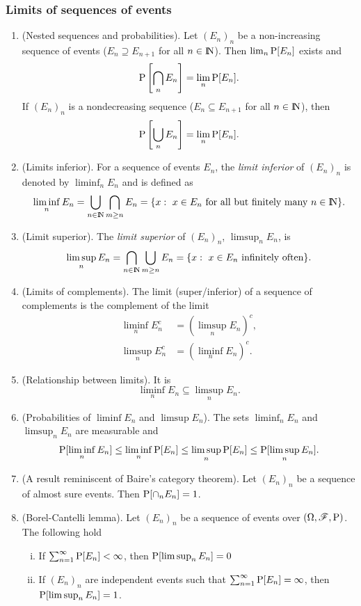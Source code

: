 \documentclass[a4paper,10pt]{scrbook}
\begin{document}
\subsubsection{Limits of sequences of events}
\begin{enumerate}
 \item (Nested sequences and probabilities). Let $(E_n)_n$ be a non-increasing sequence of events ($E_n\supseteq E_{n+1}$ for all $n\in\N$). 
       Then $\lim_n \mathrm{P}[E_n]$ exists and 
       \[
        \mathrm{P}\left[\bigcap_n E_n\right] = \lim_n \mathrm{P}[E_n].
       \]
       If $(E_n)_n$ is a nondecreasing sequence ($E_n \subseteq E_{n+1}$ for all $n\in\N$), then
       \[
        \mathrm{P}\left[\bigcup_n E_n\right] = \lim_n \mathrm{P}[E_n].
       \]


 \item (Limits inferior). For a sequence of events $E_n$, the \textit{limit inferior} of $(E_n)_n$
       is denoted by $\liminf_n E_n$ and is defined as 
       \[
        \liminf_n E_n = \bigcup_{n\in \N}\bigcap_{m\geq n}E_n = \{x:\ x\in E_n\ \text{for all but finitely many } n\in \N\}.
       \]
 \item (Limit superior). The \textit{limit superior} of $(E_n)_n$, $\limsup_n E_n$, is
       \[
        \limsup_n E_n = \bigcap_{n\in \N}\bigcup_{m\geq n}E_n = \{x:\ x\in E_n\ \text{infinitely often} \}.
       \]
 \item (Limits of complements). The limit (super/inferior) of a sequence of complements is the complement of the limit
	\begin{align*}
	 \liminf_n E_n^c &= (\limsup_n E_n)^c,\\
	 \limsup_n E_n^c &= (\liminf_n E_n)^c.
	\end{align*}

 \item (Relationship between limits). It is
       \[
        \liminf_n E_n \subseteq \limsup_n E_n.
       \]
 \item (Probabilities of $\liminf E_n$ and $\limsup E_n$). The sets $\liminf_n E_n$ and $\limsup_n E_n$ are measurable and 
 \[
  \mathrm{P}[\liminf_n E_n] \leq \liminf_n \mathrm{P}[E_n] \leq \limsup_n \mathrm{P}[E_n] \leq \mathrm{P}[\limsup_n E_n].
 \]
 
 \item (A result reminiscent of Baire's category theorem). Let $(E_n)_n$ be a sequence of almost sure events. Then
       $\mathrm{P}[\cap_n E_n] = 1$.

 \item (Borel-Cantelli lemma). Let $(E_n)_n$ be a sequence of events over $(\Omega,\mathscr{F},\mathrm{P})$. The following hold
 \begin{enumerate}[i.]
  \item If $\sum_{n=1}^{\infty}\mathrm{P}[E_n]<\infty$, then $\mathrm{P}[\limsup_n E_n] = 0$
  \item If $(E_n)_n$ are independent events such that $\sum_{n=1}^{\infty}\mathrm{P}[E_n]=\infty$, then
        $\mathrm{P}[\limsup_n E_n] = 1$.
 \end{enumerate}
 

\end{enumerate}
\end{document}

